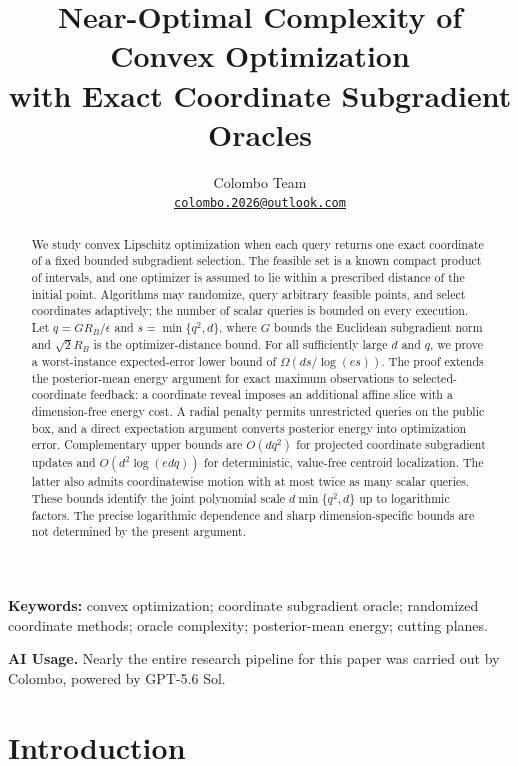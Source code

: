 \documentclass[11pt]{article}
\title{Near-Optimal Complexity of Convex Optimization\\with Exact Coordinate Subgradient Oracles}
\author{Colombo Team\\[3pt]
\small\href{mailto:colombo.2026@outlook.com}{\texttt{colombo.2026@outlook.com}}}
\date{}
\numberwithin{equation}{section}
\theoremstyle{definition}
\theoremstyle{remark}
\newcommand{\eps}{\epsilon}
\begin{document}
\maketitle
\vspace{-1.3em}
\begin{abstract}
We study convex Lipschitz optimization when each query returns one exact coordinate of a fixed bounded subgradient selection. The feasible set is a known compact product of intervals, and one optimizer is assumed to lie within a prescribed distance of the initial point. Algorithms may randomize, query arbitrary feasible points, and select coordinates adaptively; the number of scalar queries is bounded on every execution. Let $q=GR_B/\eps$ and $s=\min\{q^2,d\}$, where $G$ bounds the Euclidean subgradient norm and $\sqrt2R_B$ is the optimizer-distance bound. For all sufficiently large $d$ and $q$, we prove a worst-instance expected-error lower bound of $\Omega(ds/\log(es))$. The proof extends the posterior-mean energy argument for exact maximum observations to selected-coordinate feedback: a coordinate reveal imposes an additional affine slice with a dimension-free energy cost. A radial penalty permits unrestricted queries on the public box, and a direct expectation argument converts posterior energy into optimization error. Complementary upper bounds are $O(dq^2)$ for projected coordinate subgradient updates and $O(d^2\log(edq))$ for deterministic, value-free centroid localization. The latter also admits coordinatewise motion with at most twice as many scalar queries. These bounds identify the joint polynomial scale $d\min\{q^2,d\}$ up to logarithmic factors. The precise logarithmic dependence and sharp dimension-specific bounds are not determined by the present argument.
\end{abstract}
\noindent\textbf{Keywords:} convex optimization; coordinate subgradient oracle; randomized coordinate methods; oracle complexity; posterior-mean energy; cutting planes.

\medskip
\begin{samepage}
\noindent\textbf{AI Usage.}
Nearly the entire research pipeline for this paper was carried out by
Colombo, powered by GPT-5.6 Sol.
\par
\end{samepage}

\section{Introduction}\label{sec:intro}
\end{document}
